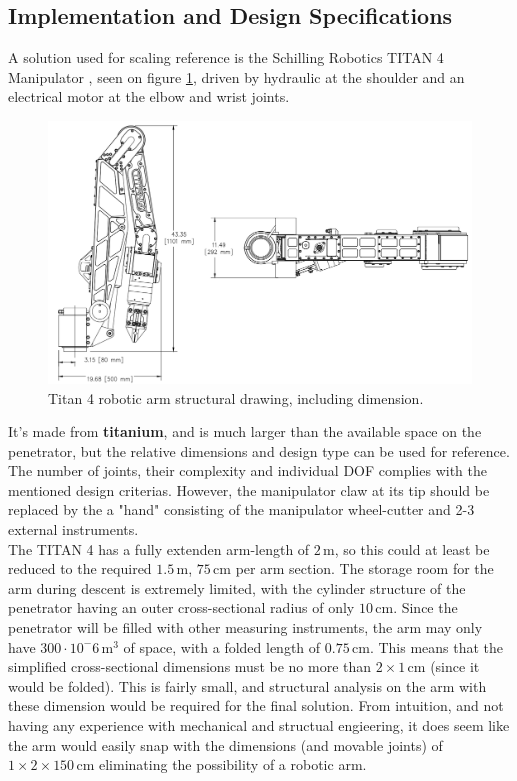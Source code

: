 
\subsection{Implementation and Design Specifications}
A solution used for scaling reference is the Schilling Robotics TITAN 4 Manipulator \cite{Titan4}, seen on figure \ref{fig:titan4}, driven by hydraulic at the shoulder and an electrical motor at the elbow and wrist joints.
\begin{figure}[htb]
	\centering
	\includegraphics[width=1\textwidth]{figures/Rasmus/Titan4}
	\caption{Titan 4 robotic arm structural drawing, including dimension.
	\label{fig:titan4}}
\end{figure}
 It's made from \textbf{titanium}, and is much larger than the available space on the penetrator, but the relative dimensions and design type can be used for reference. The number of joints, their complexity and individual DOF complies with the mentioned design criterias. However, the manipulator claw at its tip should be replaced by the a "hand" consisting of the manipulator wheel-cutter and 2-3 external instruments.\\
The TITAN 4 has a fully extenden arm-length of $2\,\mathrm{m}$, so this could at least be reduced to the required $\mathbf{1.5\,\mathrm{m}}$, $75\,\mathrm{cm}$ per arm section. The storage room for the arm during descent is extremely limited, with the cylinder structure of the penetrator having an outer cross-sectional radius of only $10\,\mathrm{cm}$. Since the penetrator will be filled with other measuring instruments, the arm may only have $300\cdot10^-6 \,\mathrm{m^3}$ of space, with a folded length of $0.75\,\mathrm{cm}$. This means that the simplified  cross-sectional dimensions must be no more than $2\times 1\,\mathrm{cm}$ (since it would be folded). This is fairly small, and structural analysis on the arm with these dimension would be required for the final solution. From intuition, and not having any experience with mechanical and structual engieering, it does seem like the arm would easily snap with the dimensions (and movable joints) of $1\times 2\times 150\,\mathrm{cm}$ eliminating the possibility of a robotic arm.\\ 
